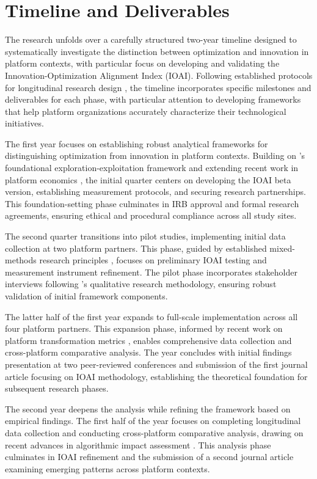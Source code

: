 \section{Timeline and Deliverables}

The research unfolds over a carefully structured two-year timeline designed to systematically investigate the distinction between optimization and innovation in platform contexts, with particular focus on developing and validating the Innovation-Optimization Alignment Index (IOAI). Following established protocols for longitudinal research design \parencite{yin2018}, the timeline incorporates specific milestones and deliverables for each phase, with particular attention to developing frameworks that help platform organizations accurately characterize their technological initiatives.

The first year focuses on establishing robust analytical frameworks for distinguishing optimization from innovation in platform contexts. Building on \textcite{march1991}'s foundational exploration-exploitation framework and extending recent work in platform economics \parencite{parker2016}, the initial quarter centers on developing the IOAI beta version, establishing measurement protocols, and securing research partnerships. This foundation-setting phase culminates in IRB approval and formal research agreements, ensuring ethical and procedural compliance across all study sites.

The second quarter transitions into pilot studies, implementing initial data collection at two platform partners. This phase, guided by established mixed-methods research principles \parencite{creswell2017}, focuses on preliminary IOAI testing and measurement instrument refinement. The pilot phase incorporates stakeholder interviews following \textcite{saldana2021}'s qualitative research methodology, ensuring robust validation of initial framework components.

The latter half of the first year expands to full-scale implementation across all four platform partners. This expansion phase, informed by recent work on platform transformation metrics \parencite{smith2023}, enables comprehensive data collection and cross-platform comparative analysis. The year concludes with initial findings presentation at two peer-reviewed conferences and submission of the first journal article focusing on IOAI methodology, establishing the theoretical foundation for subsequent research phases.

The second year deepens the analysis while refining the framework based on empirical findings. The first half of the year focuses on completing longitudinal data collection and conducting cross-platform comparative analysis, drawing on recent advances in algorithmic impact assessment \parencite{kellogg2020}. This analysis phase culminates in IOAI refinement and the submission of a second journal article examining emerging patterns across platform contexts.

